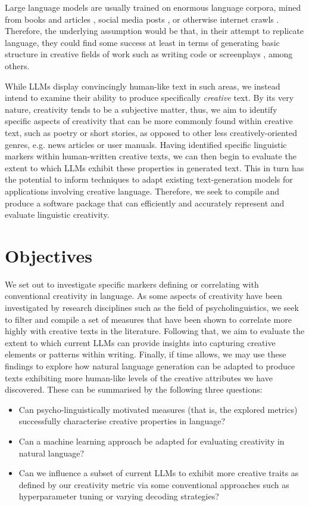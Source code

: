Large language models are usually trained on enormous language corpora, mined from books and articles \citep{gutenberg_dataset}, social media posts \citep{broad_twitter}, or otherwise internet crawls \citep{thepile_dataset}. Therefore, the underlying assumption would be that, in their attempt to replicate language, they could find some success at least in terms of generating basic structure in creative fields of work such as writing code \citep{codex_2021_copilot} or screenplays \citep{mirowski_co-writing_2022}, among others. 

While LLMs display convincingly human-like text in such areas, we instead intend to examine their ability to produce specifically \emph{creative} text. By its very nature, creativity tends to be a subjective matter, thus, we aim to identify specific aspects of creativity that can be more commonly found within creative text, such as poetry or short stories, as opposed to other less creatively-oriented genres, e.g. news articles or user manuals. Having identified specific linguistic markers within human-written creative texts, we can then begin to evaluate the extent to which LLMs exhibit these properties in generated text. This in turn has the potential to inform techniques to adapt existing text-generation models for applications involving creative language. Therefore, we seek to compile and produce a software package that can efficiently and accurately represent and evaluate linguistic creativity. 

\section{Objectives}

We set out to investigate specific markers defining or correlating with conventional creativity in language. As some aspects of creativity have been investigated by research disciplines such as the field of psycholinguistics, we seek to filter and compile a set of measures that have been shown to correlate more highly with creative texts in the literature. 
Following that, we aim to evaluate the extent to which current LLMs can provide insights into capturing creative elements or patterns within writing. Finally, if time allows, we may use these findings to explore how natural language generation can be adapted to produce texts exhibiting more human-like levels of the creative attributes we have discovered. These can be summarised by the following three questions:

\begin{itemize}
    \item Can psycho-linguistically motivated measures (that is, the explored metrics) successfully characterise creative properties in language?
    \item Can a machine learning approach be adapted for evaluating creativity in natural language?
    \item Can we influence a subset of current LLMs to exhibit more creative traits as defined by our creativity metric via some conventional approaches such as hyperparameter tuning or varying decoding strategies? 
\end{itemize}

